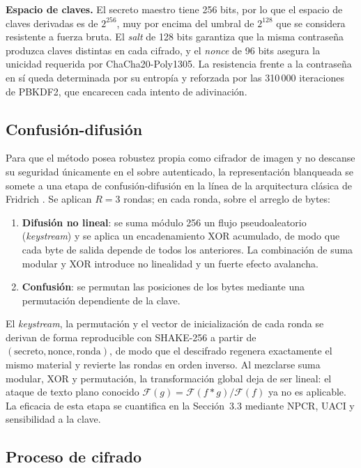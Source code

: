 \documentclass{llncs}
\begin{document}
\textbf{Espacio de claves.} El secreto maestro tiene 256 bits, por lo que el
espacio de claves derivadas es de $2^{256}$, muy por encima del umbral de
$2^{128}$ que se considera resistente a fuerza bruta. El \emph{salt} de 128
bits garantiza que la misma contrase\~na produzca claves distintas en cada
cifrado, y el \emph{nonce} de 96 bits asegura la unicidad requerida por
ChaCha20-Poly1305. La resistencia frente a la contrase\~na en s\'i queda
determinada por su entrop\'ia y reforzada por las 310\,000 iteraciones de
PBKDF2, que encarecen cada intento de adivinaci\'on.

\subsection{Confusi\'on-difusi\'on}

Para que el m\'etodo posea robustez propia como cifrador de imagen y no
descanse su seguridad \'unicamente en el sobre autenticado, la
representaci\'on blanqueada se somete a una etapa de confusi\'on-difusi\'on
en la l\'inea de la arquitectura cl\'asica de Fridrich \cite{fridrich}. Se
aplican $R=3$ rondas; en cada ronda, sobre el arreglo de bytes:

\begin{enumerate}
  \item \textbf{Difusi\'on no lineal}: se suma m\'odulo 256 un flujo
    pseudoaleatorio (\emph{keystream}) y se aplica un encadenamiento XOR
    acumulado, de modo que cada byte de salida depende de todos los
    anteriores. La combinaci\'on de suma modular y XOR introduce no
    linealidad y un fuerte efecto avalancha.
  \item \textbf{Confusi\'on}: se permutan las posiciones de los bytes
    mediante una permutaci\'on dependiente de la clave.
\end{enumerate}

El \emph{keystream}, la permutaci\'on y el vector de inicializaci\'on de cada
ronda se derivan de forma reproducible con SHAKE-256 a partir de
$(\text{secreto}, \text{nonce}, \text{ronda})$, de modo que el descifrado
regenera exactamente el mismo material y revierte las rondas en orden
inverso. Al mezclarse suma modular, XOR y permutaci\'on, la transformaci\'on
global deja de ser lineal: el ataque de texto plano conocido
$\mathcal{F}(g)=\mathcal{F}(f*g)/\mathcal{F}(f)$ ya no es aplicable. La
eficacia de esta etapa se cuantifica en la Secci\'on~3.3 mediante NPCR, UACI
y sensibilidad a la clave.

\subsection{Proceso de cifrado}
\end{document}
